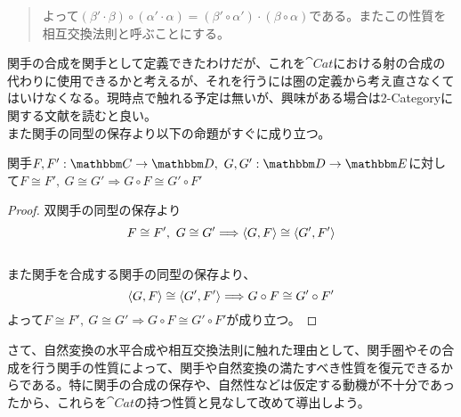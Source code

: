 \begin{define}[関手を合成する関手]
\begin{quote}
\begin{mydescription}
\begin{center}
\begin{tikzpicture}[auto]
      \end{tikzpicture}
    \end{center}
    よって$(\beta'\cdot\beta)\circ(\alpha'\cdot\alpha)=(\beta'\circ\alpha')\cdot(\beta\circ\alpha)$である。またこの性質を相互交換法則と呼ぶことにする。
		\end{mydescription}
		\end{quote}
  \end{define}
  関手の合成を関手として定義できたわけだが、これを$\cat{Cat}$における射の合成の代わりに使用できるかと考えるが、それを行うには圏の定義から考え直さなくてはいけなくなる。現時点で触れる予定は無いが、興味がある場合は2-Categoryに関する文献を読むと良い。\\
  また関手の同型の保存より以下の命題がすぐに成り立つ。
  \begin{prop}[関手合成の同型の保存]
    関手$\functor{F,F'}{C}{D},\ \functor{G,G'}{D}{E}$に対して$F\cong F',\ G\cong G'\Longrightarrow G\circ F\cong G'\circ F'$
  \end{prop}
  \begin{proof}
    双関手の同型の保存より\[F\cong F',\ G\cong G'\Longrightarrow\tuple{G,F}\cong\tuple{G',F'}\]\\
    また関手を合成する関手の同型の保存より、\[\tuple{G,F}\cong\tuple{G',F'}\Longrightarrow G\circ F\cong G'\circ F'\]
    よって$F\cong F',\ G\cong G'\Longrightarrow G\circ F\cong G'\circ F'$が成り立つ。
  \end{proof}
  さて、自然変換の水平合成や相互交換法則に触れた理由として、関手圏やその合成を行う関手の性質によって、関手や自然変換の満たすべき性質を復元できるからである。特に関手の合成の保存や、自然性などは仮定する動機が不十分であったから、これらを$\cat{Cat}$の持つ性質と見なして改めて導出しよう。\\


